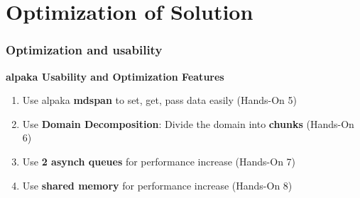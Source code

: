 \documentclass[9pt]{beamer}
\begin{document}
\section{Optimization of Solution}

\begin{frame}
\frametitle{Optimization and usability}
\begin{center}
      \Huge \textbf{alpaka Usability and Optimization Features}
  \end{center}
\begin{enumerate}
 \item Use alpaka \textbf{mdspan} to set, get, pass data easily (Hands-On 5)
 \item Use \textbf{Domain Decomposition}: Divide the domain into \textbf{chunks} (Hands-On 6)
 \item Use \textbf{2 asynch queues} for performance increase (Hands-On 7)
 \item Use \textbf{shared memory} for performance increase (Hands-On 8)
\end{enumerate}
    \end{frame}
\end{document}
